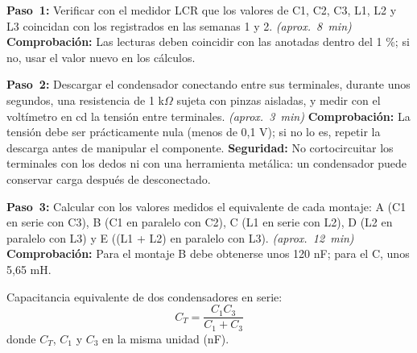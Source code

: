 \documentclass[12pt]{article}
\begin{document}
\begin{pasos}
  \item \textbf{Paso~1:} Verificar con el medidor LCR que los valores de C1, C2, C3, L1, L2 y L3 coincidan con los registrados en las semanas 1 y 2. \emph{(aprox.~\SI{8}{\minute})} \textbf{Comprobación:} Las lecturas deben coincidir con las anotadas dentro del 1 \%; si no, usar el valor nuevo en los cálculos.
  \item \textbf{Paso~2:} Descargar el condensador conectando entre sus terminales, durante unos segundos, una resistencia de 1 k\ensuremath{\Omega} sujeta con pinzas aisladas, y medir con el voltímetro en cd la tensión entre terminales. \emph{(aprox.~\SI{3}{\minute})} \textbf{Comprobación:} La tensión debe ser prácticamente nula (menos de 0,1 V); si no lo es, repetir la descarga antes de manipular el componente. \textbf{Seguridad:} No cortocircuitar los terminales con los dedos ni con una herramienta metálica: un condensador puede conservar carga después de desconectado.
  \item \textbf{Paso~3:} Calcular con los valores medidos el equivalente de cada montaje: A (C1 en serie con C3), B (C1 en paralelo con C2), C (L1 en serie con L2), D (L2 en paralelo con L3) y E ((L1 + L2) en paralelo con L3). \emph{(aprox.~\SI{12}{\minute})} \textbf{Comprobación:} Para el montaje B debe obtenerse unos 120 nF; para el C, unos 5,65 mH.
\par Capacitancia equivalente de dos condensadores en serie:
\begin{equation}
  C_T = \frac{C_1 C_3}{C_1 + C_3}
  \label{eq:paso-3}
\end{equation}
donde $C_T$, $C_1$ y $C_3$ en la misma unidad (nF).
\end{pasos}
\end{document}

